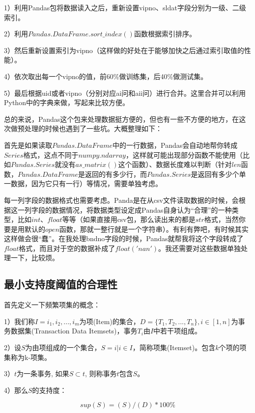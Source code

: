 \documentclass{article}
\begin{document}
\begin{CJK}{UTF8}{gbsn}
1）利用Pandas包将数据读入之后，重新设置vipno、sldat字段分别为一级、二级索引。

2）利用$Pandas.DataFrame.sort\_index()$函数根据索引排序。

3）然后重新设置索引为vipno（这样做的好处在于能够加快之后通过索引取值的性能）。

4）依次取出每一个vipno的值，前60\%做训练集，后40\%做测试集。

5）最后根据uid或者vipno（分别对应ai问和aii问）进行合并。这里合并可以利用Python中的字典来做，写起来比较方便。

总的来说，Pandas这个包来处理数据挺方便的，但也有一些不方便的地方，在这次做预处理的时候也遇到了一些坑。大概整理如下：

首先是如果读取$Pandas.DataFrame$中的一行数据，Pandas会自动地帮你转成$Series$格式，这点不同于$numpy.ndarray$，这样就可能出现部分函数不能使用（比如$Pandas.Series$就没有$as\_matrix()$这个函数）、数据长度难以判断（针对$len$函数，$Pandas.DataFrame$是返回的有多少行，而$Pandas.Series$是返回有多少个单一数据，因为它只有一行）等情况，需要单独考虑。

每一列字段的数据格式也需要考虑。Panda是在从csv文件读取数据的时候，会根据这一列字段的数据情况，将数据类型设定成Pandas自身认为“合理”的一种类型，比如$int$、$float$等等（如果直接用csv包，那么读出来的都是$str$格式，当然你要是用默认的$open$函数，那就一整行就是一个字符串）。有利有弊吧，有时候其实这样做会很“蠢”。在我处理bndno字段的时候，Pandas就帮我将这个字段转成了$float$格式，而且对于空的数据补成了$float('nan')$。我还需要对这些数据单独处理一下，比较烦。

\subsection{最小支持度阈值的合理性}

首先定义一下频繁项集的概念：

1）我们称$I={i_{1},i_2,...,i_m}$为项(Item)的集合，$D=\{T_1,T_2,...,T_n\},i\in[1,n]$为事务数据集(Transaction Data Itemsets)，事务$T_i$由$I$中若干项组成。

2）设$S$为由项组成的一个集合，$S={i| i \in I}$，简称项集(Itemset)。包含$k$个项的项集称为k-项集。

3）$t$为一条事务, 如果$S \subset t$, 则称事务$t$包含$S$。

4）那么$S$的支持度：

\begin{equation}
sup(S) = (S)/(D) * 100\%
\end{equation}


\end{CJK}
\end{document}
